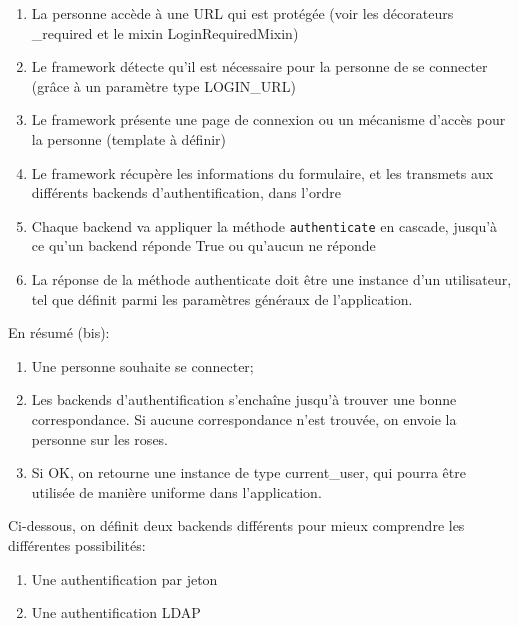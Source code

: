 \documentclass[11pt]{amsbook}
\begin{document}
\begin{enumerate}

\item{La personne accède à une URL qui est protégée (voir les décorateurs \@login\_required et le mixin LoginRequiredMixin)}

\item{Le framework détecte qu’il est nécessaire pour la personne de se connecter (grâce à un paramètre type LOGIN\_URL)}

\item{Le framework présente une page de connexion ou un mécanisme d’accès pour la personne (template à définir)}

\item{Le framework récupère les informations du formulaire, et les transmets aux différents backends d’authentification, dans l’ordre}

\item{Chaque backend va appliquer la méthode \texttt{authenticate} en cascade, jusqu’à ce qu’un backend réponde True ou qu’aucun ne réponde}

\item{La réponse de la méthode authenticate doit être une instance d’un utilisateur, tel que définit parmi les paramètres généraux de l’application.}

\end{enumerate}


En résumé (bis):


\begin{enumerate}

\item{Une personne souhaite se connecter;}

\item{Les backends d’authentification s’enchaîne jusqu’à trouver une bonne correspondance. Si aucune correspondance n’est trouvée, on envoie la personne sur les roses.}

\item{Si OK, on retourne une instance de type current\_user, qui pourra être utilisée de manière uniforme dans l’application.}

\end{enumerate}


Ci-dessous, on définit deux backends différents pour mieux comprendre les différentes possibilités:


\begin{enumerate}

\item{Une authentification par jeton}

\item{Une authentification LDAP}

\end{enumerate}
\end{document}
